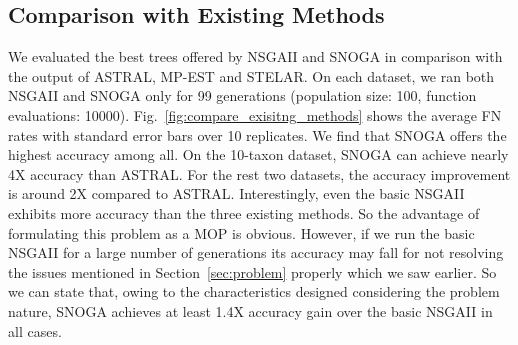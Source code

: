 \subsection{Comparison with Existing Methods}
We evaluated the best trees offered by NSGAII and SNOGA in comparison with the output of ASTRAL, MP-EST and STELAR. 
On each dataset, we ran both NSGAII and SNOGA only for 99 generations (population size: 100, function evaluations: 10000). 
Fig.~\ref{fig:compare_exisitng_methods} shows the average FN rates with standard error bars over 10 replicates. We find that SNOGA offers the highest accuracy among all. On the 10-taxon dataset, SNOGA can achieve nearly 4X accuracy than ASTRAL. For the rest two datasets, the accuracy improvement is around 2X compared to ASTRAL. Interestingly, even the basic NSGAII exhibits more accuracy than the three existing methods. So the advantage of formulating this problem as a MOP is obvious. However, if we run the basic NSGAII for a large number of generations its accuracy may fall for not resolving the issues mentioned in Section~\ref{sec:problem} properly which we saw earlier. So we can state that, owing to the characteristics designed considering the problem nature, SNOGA achieves at least 1.4X accuracy gain over the basic NSGAII in all cases. 





